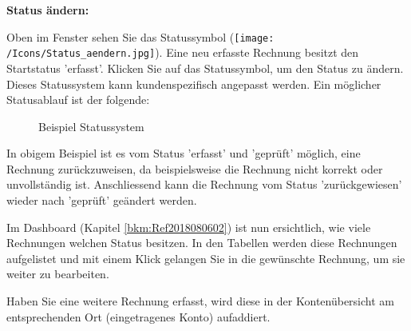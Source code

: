 \vspace{\baselineskip}

\textbf{Status ändern:}

\vspace{\baselineskip}

Oben im Fenster sehen Sie das Statussymbol (\texttt{[image: /Icons/Status\_aendern.jpg]}). Eine neu erfasste Rechnung besitzt den Startstatus 'erfasst'. Klicken Sie auf das Statussymbol, um den Status zu ändern. Dieses Statussystem kann kundenspezifisch angepasst werden. Ein möglicher Statusablauf ist der folgende:

\begin{figure}[H]
\caption{Beispiel Statussystem}
\end{figure}
In obigem Beispiel ist es vom Status 'erfasst' und 'geprüft' möglich, eine Rechnung zurückzuweisen, da beispielsweise die Rechnung nicht korrekt oder unvollständig ist. Anschliessend kann die Rechnung vom Status 'zurückgewiesen' wieder nach 'geprüft' geändert werden.

\vspace{\baselineskip}

Im Dashboard (Kapitel \ref{bkm:Ref2018080602}) ist nun ersichtlich, wie viele Rechnungen welchen Status besitzen. In den Tabellen werden diese Rechnungen aufgelistet und mit einem Klick gelangen Sie in die gewünschte Rechnung, um sie weiter zu bearbeiten.

\vspace{\baselineskip}

Haben Sie eine weitere Rechnung erfasst, wird diese in der Kontenübersicht am entsprechenden Ort (eingetragenes Konto) aufaddiert.
